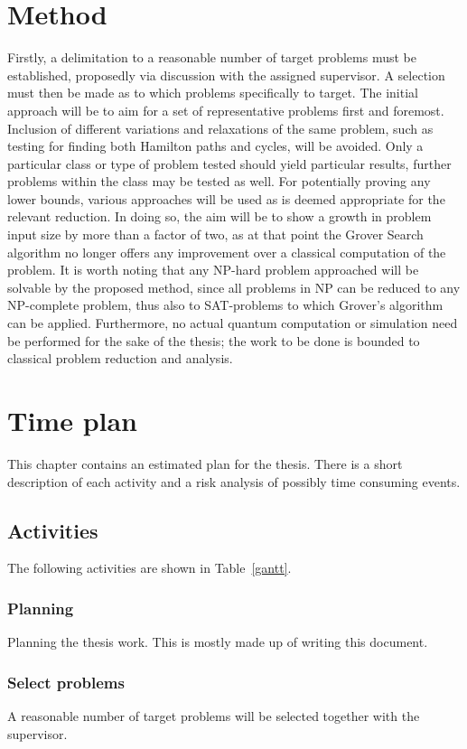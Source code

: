 \documentclass[msc,lith,english]{liuthesis}
\begin{document}
\chapter{Method}
Firstly, a delimitation to a reasonable number of target problems must be established, proposedly via discussion with the assigned supervisor. A selection must then be made as to which problems specifically to target. The initial approach will be to aim for a set of representative problems first and foremost. Inclusion of different variations and relaxations of the same problem, such as testing for finding both Hamilton paths and cycles, will be avoided. Only a particular class or type of problem tested should yield particular results, further problems within the class may be tested as well. For potentially proving any lower bounds, various approaches will be used as is deemed appropriate for the relevant reduction. In doing so, the aim will be to show a growth in problem input size by more than a factor of two, as at that point the Grover Search algorithm no longer offers any improvement over a classical computation of the problem. It is worth noting that any NP-hard problem approached will be solvable by the proposed method, since all problems in NP can be reduced to any NP-complete problem, thus also to SAT-problems to which Grover’s algorithm can be applied. Furthermore, no actual quantum computation or simulation need be performed for the sake of the thesis; the work to be done is bounded to classical problem reduction and analysis.

\chapter{Time plan}
This chapter contains an estimated plan for the thesis. There is a short description of each activity and a risk analysis of possibly time consuming events.

\section{Activities}
The following activities are shown in Table~\ref{gantt}.

\subsection{Planning}
Planning the thesis work. This is mostly made up of writing this document.

\subsection{Select problems}
A reasonable number of target problems will be selected together with the supervisor.
\end{document}
